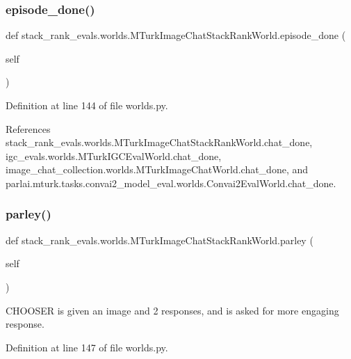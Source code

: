 \subsubsection{\texorpdfstring{episode\+\_\+done()}{episode\_done()}}
{\footnotesize\ttfamily def stack\+\_\+rank\+\_\+evals.\+worlds.\+M\+Turk\+Image\+Chat\+Stack\+Rank\+World.\+episode\+\_\+done (\begin{DoxyParamCaption}\item[{}]{self }\end{DoxyParamCaption})}



Definition at line 144 of file worlds.\+py.



References stack\+\_\+rank\+\_\+evals.\+worlds.\+M\+Turk\+Image\+Chat\+Stack\+Rank\+World.\+chat\+\_\+done, igc\+\_\+evals.\+worlds.\+M\+Turk\+I\+G\+C\+Eval\+World.\+chat\+\_\+done, image\+\_\+chat\+\_\+collection.\+worlds.\+M\+Turk\+Image\+Chat\+World.\+chat\+\_\+done, and parlai.\+mturk.\+tasks.\+convai2\+\_\+model\+\_\+eval.\+worlds.\+Convai2\+Eval\+World.\+chat\+\_\+done.

\mbox{\label{classstack__rank__evals_1_1worlds_1_1MTurkImageChatStackRankWorld_ace7af06e8b400b73e2d122b00293ec69}} 
\subsubsection{\texorpdfstring{parley()}{parley()}}
{\footnotesize\ttfamily def stack\+\_\+rank\+\_\+evals.\+worlds.\+M\+Turk\+Image\+Chat\+Stack\+Rank\+World.\+parley (\begin{DoxyParamCaption}\item[{}]{self }\end{DoxyParamCaption})}

\begin{DoxyVerb}CHOOSER is given an image and 2 responses, and is asked
   for more engaging response.
\end{DoxyVerb}
 

Definition at line 147 of file worlds.\+py.



